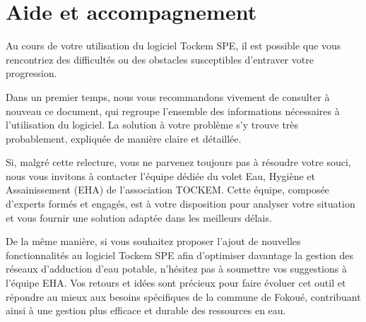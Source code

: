 \chapter{Aide et accompagnement}

Au cours de votre utilisation du logiciel Tockem SPE, il est possible que vous rencontriez des difficultés ou des obstacles susceptibles d'entraver votre progression.

Dans un premier temps, nous vous recommandons vivement de consulter à nouveau ce document, qui regroupe l'ensemble des informations nécessaires à l'utilisation du logiciel. La solution à votre problème s'y trouve très probablement, expliquée de manière claire et détaillée.

Si, malgré cette relecture, vous ne parvenez toujours pas à résoudre votre souci, nous vous invitons à contacter l'équipe dédiée du volet Eau, Hygiène et Assainissement (EHA) de l'association TOCKEM. Cette équipe, composée d'experts formés et engagés, est à votre disposition pour analyser votre situation et vous fournir une solution adaptée dans les meilleurs délais.

De la même manière, si vous souhaitez proposer l'ajout de nouvelles fonctionnalités au logiciel Tockem SPE afin d'optimiser davantage la gestion des réseaux d'adduction d'eau potable, n'hésitez pas à soumettre vos suggestions à l'équipe EHA. Vos retours et idées sont précieux pour faire évoluer cet outil et répondre au mieux aux besoins spécifiques de la commune de Fokoué, contribuant ainsi à une gestion plus efficace et durable des ressources en eau.
